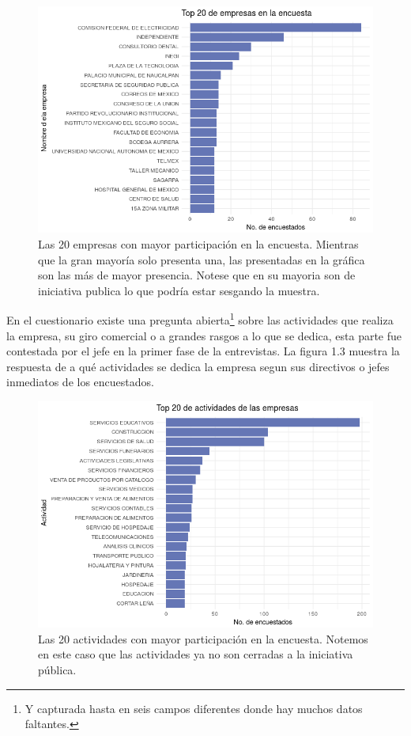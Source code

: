 \documentclass[paper=letter, fontsize=11pt]{scrartcl}
\numberwithin{equation}{section} %
\numberwithin{figure}{section} %
\numberwithin{table}{section} %
\begin{document}
\begin{figure}[H]
  \begin{center}
    \includegraphics[scale=.5]{20_empresas.png}
    \caption{ Las 20 empresas con mayor participación en la encuesta. Mientras que la gran mayoría solo presenta una, las presentadas en la gráfica son las más de mayor presencia. Notese que en su mayoria son de iniciativa publica lo que podría estar sesgando la muestra. }
    \label{figura1_2}
  \end{center}
\end{figure}
En el cuestionario existe una pregunta abierta\footnote{Y capturada hasta en seis campos diferentes donde hay muchos datos faltantes.} sobre las actividades que realiza la empresa, su giro comercial o a grandes rasgos a lo que se dedica, esta parte fue contestada por el jefe en la primer fase de la entrevistas. La figura 1.3 muestra la respuesta de a qué actividades se dedica la empresa segun sus directivos o jefes inmediatos de los encuestados. 

\begin{figure}[H]
  \begin{center}
    \includegraphics[scale=.5]{20_actividades.png}
    \caption{ Las 20 actividades con mayor participación en la encuesta. Notemos en este caso que las actividades ya no son cerradas a la iniciativa pública.}
    \label{figura1_2}
  \end{center}
\end{figure}
\end{document}
